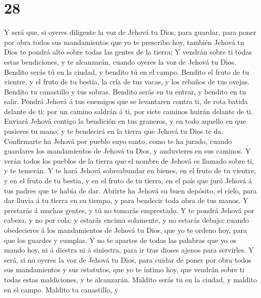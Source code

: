 \hypertarget{section-27}{%
\section{28}\label{section-27}}

 Y será que, si oyeres diligente la voz de Jehová tu Dios,
para guardar, para poner por obra todos sus mandamientos que yo te
prescribo hoy, también Jehová tu Dios te pondrá alto sobre todas las
gentes de la tierra;  Y vendrán sobre ti todas estas
bendiciones, y te alcanzarán, cuando oyeres la voz de Jehová tu Dios.
 Bendito serás tú en la ciudad, y bendito tú en el campo.
 Bendito el fruto de tu vientre, y el fruto de tu bestia,
la cría de tus vacas, y los rebaños de tus ovejas. 
Bendito tu canastillo y tus sobras.  Bendito serás en tu
entrar, y bendito en tu salir.  Pondrá Jehová á tus
enemigos que se levantaren contra ti, de rota batida delante de ti: por
un camino saldrán á ti, por siete caminos huirán delante de ti.
 Enviará Jehová contigo la bendición en tus graneros, y en
todo aquello en que pusieres tu mano; y te bendecirá en la tierra que
Jehová tu Dios te da.  Confirmarte ha Jehová por pueblo
suyo santo, como te ha jurado, cuando guardares los mandamientos de
Jehová tu Dios, y anduvieres en sus caminos.  Y verán
todos los pueblos de la tierra que el nombre de Jehová es llamado sobre
ti, y te temerán.  Y te hará Jehová sobreabundar en
bienes, en el fruto de tu vientre, y en el fruto de tu bestia, y en el
fruto de tu tierra, en el país que juró Jehová á tus padres que te había
de dar.  Abrirte ha Jehová su buen depósito, el cielo,
para dar lluvia á tu tierra en su tiempo, y para bendecir toda obra de
tus manos. Y prestarás á muchas gentes, y tú no tomarás emprestado.
 Y te pondrá Jehová por cabeza, y no por cola: y estarás
encima solamente, y no estarás debajo; cuando obedecieres á los
mandamientos de Jehová tu Dios, que yo te ordeno hoy, para que los
guardes y cumplas.  Y no te apartes de todas las palabras
que yo os mando hoy, ni á diestra ni á siniestra, para ir tras dioses
ajenos para servirles.  Y será, si no oyeres la voz de
Jehová tu Dios, para cuidar de poner por obra todos sus mandamientos y
sus estatutos, que yo te intimo hoy, que vendrán sobre ti todas estas
maldiciones, y te alcanzarán.  Maldito serás tu en la
ciudad, y maldito en el campo.  Maldito tu canastillo, y
